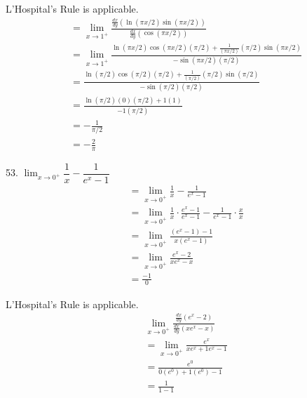 \documentclass{article}
\begin{document}
\begin{description}
\begin{description}
                L'Hospital's Rule is applicable.
                \begin{align*}
                   & = \lim_{x\to1^+}\frac{\frac{dx}{dy}(\ln{(\pi x/2)}\sin{(\pi x/2)})}{\frac{dx}{dy}(\cos{(\pi x/2)})}                                   \\[1em]
                   & = \lim_{x\to1^+}\frac{\ln{(\pi x/2)}\cos{(\pi x/2)}(\pi /2)  +  \frac{1}{(\pi x/2)}(\pi /2)\sin{(\pi x/2)}}{-\sin{(\pi x/2)}(\pi /2)} \\[1em]
                   & = \frac{\ln{(\pi /2)}\cos{(\pi /2)}(\pi /2)  +  \frac{1}{(\pi /2)}(\pi /2)\sin{(\pi /2)}}{-\sin{(\pi /2)}(\pi /2)}                    \\[1em]
                   & = \frac{\ln{(\pi /2)}(0)(\pi /2)  +  1(1)}{-1(\pi /2)}                                                                                \\[1em]
                   & = -\frac{1}{\pi /2}                                                                                                                   \\[1em]
                   & = \boxed{-\frac{2}{\pi }}
                \end{align*}
          \item 53. $\lim_{x\to0^+}\dfrac{1}{x} - \dfrac{1}{e^x-1}$
                \begin{align*}
                   & =  \lim_{x\to0^+}\frac{1}{x} - \frac{1}{e^x-1}                                             \\[1em]
                   & =  \lim_{x\to0^+}\frac{1}{x} \cdot \frac{e^x-1}{e^x-1} - \frac{1}{e^x-1} \cdot \frac{x}{x} \\[1em]
                   & =  \lim_{x\to0^+}\frac{(e^x-1) - 1}{x(e^x-1)}                                              \\[1em]
                   & =  \lim_{x\to0^+}\frac{e^x-2}{xe^x-x}                                                      \\[1em]
                   & =  \frac{-1}{0}
                \end{align*}

                L'Hospital's Rule is applicable.
                \begin{align*}
                   & \lim_{x\to0^+}\frac{\frac{dx}{dy}(e^x-2)}{\frac{dx}{dy}(xe^x-x)} \\[1em]
                   & =  \lim_{x\to0^+}\frac{e^x}{xe^x + 1e^x -1}                      \\[1em]
                   & =  \frac{e^0}{0(e^0) + 1(e^0) -1}                                \\[1em]
                   & =  \frac{1}{1 - 1}                                               \\[1em]
                \end{align*}


\end{description}
\end{description}
\end{document}
